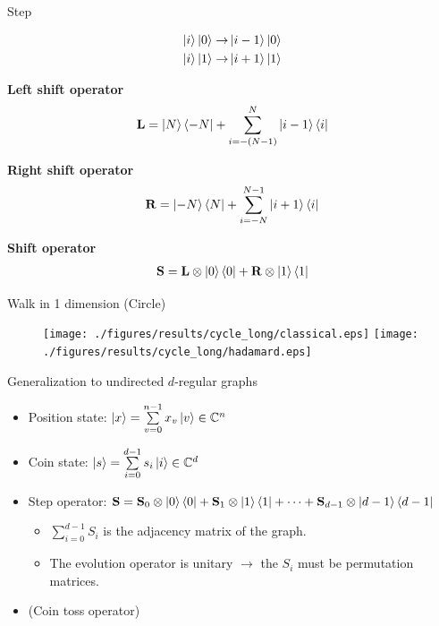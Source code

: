 \documentclass[aspectratio=169]{beamer}
\begin{document}
\begin{frame}{Step}

\vspace{-1.5cm}
\begin{align*}
\ket{i}\ket{0} \rightarrow& \ket{i-1}\ket{0} \\
\ket{i}\ket{1} \rightarrow& \ket{i+1}\ket{1}
\end{align*}

\pause

\textbf{Left shift operator}
\vspace{-0.5cm}
\begin{align*}
\mathbf{L} = \ket{N}\bra{-N} + \sum\limits_{i=-(N-1)}^{N} \ket{i-1}\bra{i}
\end{align*}

\pause

\textbf{Right shift operator}
\vspace{-0.5cm}
\begin{align*}
\mathbf{R} = \ket{-N}\bra{N} + \sum\limits_{i=-N}^{N-1} \ket{i+1}\bra{i} 
\end{align*}

\pause

\textbf{Shift operator}
\vspace{-0.5cm}
\begin{align*}
  \mathbf{S} = \mathbf{L}\otimes\ket{0}\bra{0} + \mathbf{R}\otimes\ket{1}\bra{1}
\end{align*}

\end{frame}

\begin{frame}{Walk in 1 dimension (Circle)}
\begin{figure}[H]
  \centering
  \texttt{[image: ./figures/results/cycle\_long/classical.eps]}
  \texttt{[image: ./figures/results/cycle\_long/hadamard.eps]}
\end{figure}
\end{frame}

\begin{frame}{Generalization to undirected $d$-regular graphs}
\begin{itemize}\pause
    \item Position state: $\ket{x} = \sum\limits_{v=0}^{n-1}x_v\ket{v} \in{} \mathbb{C}^{n}$ \pause
    \item Coin state: $\ket{s} = \sum\limits_{i=0}^{d-1}s_i\ket{i} \in{} \mathbb{C}^{d}$ \pause
    \item Step operator: $\mathbf{S} = \mathbf{S}_0\otimes \ket{0}\bra{0} + \mathbf{S}_1 \otimes\ket{1}\bra{1} + \dots + \mathbf{S}_{d-1}\otimes \ket{d-1}\bra{d-1}$
    \begin{itemize}
        \item $\sum\limits_{i=0}^{d-1}S_i$ is the adjacency matrix of the graph.
        \item The evolution operator is unitary $\rightarrow$ the $S_i$ must be permutation matrices.\pause
    \end{itemize}
    \item (Coin toss operator)
\end{itemize}
\end{frame}
\end{document}

